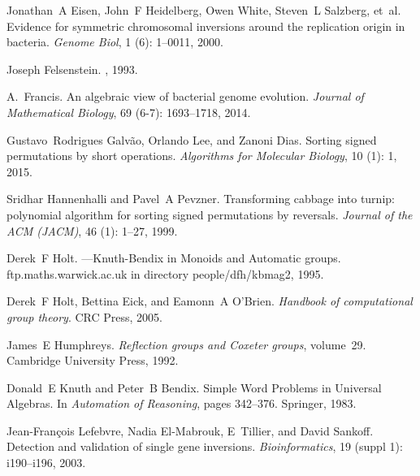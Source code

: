 \documentclass[utf8]{Frontiers_LaTex_Templates/frontiersFPHY} %
\numberwithin{equation}{section}
\begin{document}
\begin{thebibliography}{38}
Jonathan~A Eisen, John~F Heidelberg, Owen White, Steven~L Salzberg, et~al.
\newblock Evidence for symmetric chromosomal inversions around the replication
  origin in bacteria.
\newblock \emph{Genome Biol}, 1 (6): 1--0011, 2000.

Joseph Felsenstein.
, 1993.

A.~Francis.
\newblock An algebraic view of bacterial genome evolution.
\newblock \emph{Journal of Mathematical Biology}, 69 (6-7):
  1693--1718, 2014.

Gustavo~Rodrigues Galv{\~a}o, Orlando Lee, and Zanoni Dias.
\newblock Sorting signed permutations by short operations.
\newblock \emph{Algorithms for Molecular Biology}, 10 (1): 1,
  2015.

Sridhar Hannenhalli and Pavel~A Pevzner.
\newblock Transforming cabbage into turnip: polynomial algorithm for sorting
  signed permutations by reversals.
\newblock \emph{Journal of the ACM (JACM)}, 46 (1): 1--27,
  1999.

Derek~F Holt.
---{K}nuth-{B}endix in {M}onoids and {A}utomatic groups.
\newblock ftp.maths.warwick.ac.uk in directory people/dfh/kbmag2, 1995.

Derek~F Holt, Bettina Eick, and Eamonn~A O'Brien.
\newblock \emph{Handbook of computational group theory}.
\newblock CRC Press, 2005.

James~E Humphreys.
\newblock \emph{Reflection groups and Coxeter groups}, volume~29.
\newblock Cambridge University Press, 1992.

Donald~E Knuth and Peter~B Bendix.
\newblock Simple {W}ord {P}roblems in {U}niversal {A}lgebras.
\newblock In \emph{Automation of Reasoning}, pages 342--376. Springer, 1983.

Jean-Fran{\c{c}}ois Lefebvre, Nadia El-Mabrouk, E~Tillier, and David Sankoff.
\newblock Detection and validation of single gene inversions.
\newblock \emph{Bioinformatics}, 19 (suppl 1): i190--i196,
  2003.


\end{thebibliography}
\end{document}
